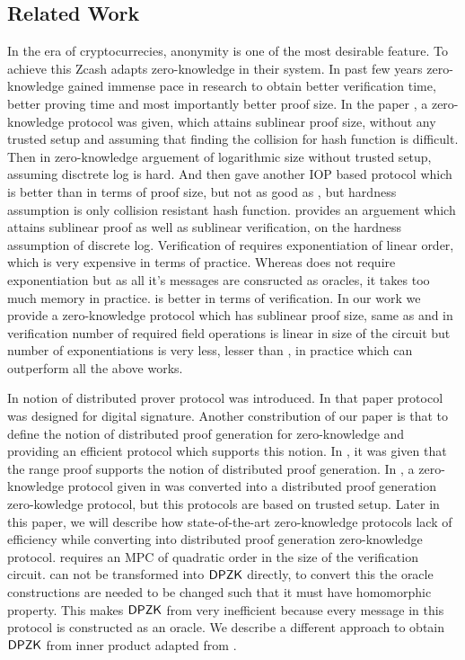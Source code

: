 \subsection{Related Work}

In the era of cryptocurrecies, anonymity is one of the most desirable feature. To achieve this Zcash adapts zero-knowledge in their system. In past few years zero-knowledge gained immense pace in research to obtain better verification time, better proving time and most importantly better proof size. In the paper \cite{Ligero2017}, a zero-knowledge protocol was given, which attains sublinear proof size, without any trusted setup and assuming that finding the collision for hash function is difficult. Then in \cite{Bulletproofs} zero-knowledge arguement of logarithmic size without trusted setup, assuming disctrete log is hard. And then \cite{Aurora} gave another IOP based protocol which is better than \cite{Ligero2017} in terms of proof size, but not as good as \cite{Bulletproofs}, but hardness assumption is only collision resistant hash function. \cite{spartan} provides an arguement which attains sublinear proof as well as sublinear verification, on the hardness assumption of discrete log. Verification of \cite{Bulletproofs} requires exponentiation of linear order, which is very expensive in terms of practice. Whereas \cite{Aurora} does not require exponentiation but as all it's messages are consructed as oracles, it takes too much memory in practice. \cite{spartan} is better in terms of verification. In our work we provide a zero-knowledge protocol which has sublinear proof size, same as \cite{spartan} and in verification number of required field operations is linear in size of the circuit but number of exponentiations is very less, lesser than \cite{spartan}, in practice which can outperform all the above works.

In \cite{DDS} notion of distributed prover protocol was introduced. In that paper protocol was designed for digital signature. Another constribution of our paper is that to define the notion of distributed proof generation for zero-knowledge and providing an efficient protocol which supports this notion. In \cite{Bulletproofs}, it was given that the range proof supports the notion of distributed proof generation. In \cite{Trinocchio}, a zero-knowledge protocol given in \cite{pinnochio_PHGR} was converted into a distributed proof generation zero-kowledge protocol, but this protocols are based on trusted setup. Later in this paper, we will describe how state-of-the-art zero-knowledge protocols lack of efficiency while converting into distributed proof generation zero-knowledge protocol. \cite{spartan} requires an MPC of quadratic order in the size of the verification circuit. \cite{Ligero2017, Aurora} can not be transformed into $\mathsf{DPZK}$ directly, to convert this the oracle constructions are needed to be changed such that it must have homomorphic property. This makes $\mathsf{DPZK}$ from \cite{Aurora} very inefficient because every message in this protocol is constructed as an oracle. We describe a different approach to obtain $\mathsf{DPZK}$ from inner product adapted from \cite{Bulletproofs}.
